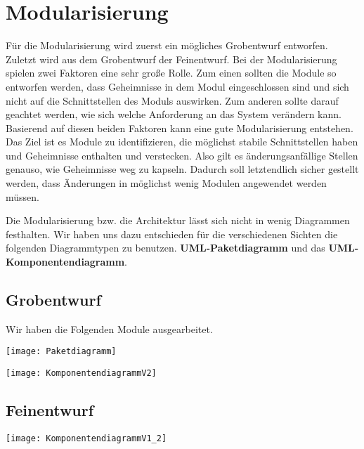 
\clearpage

\section{Modularisierung}
Für die Modularisierung wird zuerst ein mögliches Grobentwurf entworfen. Zuletzt wird aus dem Grobentwurf der Feinentwurf. Bei der Modularisierung spielen zwei Faktoren eine sehr große Rolle. Zum einen sollten die Module so entworfen werden, dass Geheimnisse in dem Modul eingeschlossen sind und sich nicht auf die Schnittstellen des Moduls auswirken. Zum anderen sollte darauf geachtet werden, wie sich welche Anforderung an das System verändern kann. Basierend auf diesen beiden Faktoren kann eine gute Modularisierung entstehen. Das Ziel ist es Module zu identifizieren, die möglichst stabile Schnittstellen haben und Geheimnisse enthalten und verstecken. Also gilt es änderungsanfällige Stellen genauso, wie Geheimnisse weg zu kapseln. Dadurch soll letztendlich sicher gestellt werden, dass Änderungen in möglichst wenig Modulen angewendet werden müssen. 

\vspace{6pt}

Die Modularisierung bzw. die Architektur lässt sich nicht in wenig Diagrammen festhalten. Wir haben uns dazu entschieden für die verschiedenen Sichten die folgenden Diagrammtypen zu benutzen. \textbf{UML-Paketdiagramm} und das \textbf{UML-Komponentendiagramm}.

\newpage

\subsection{Grobentwurf}
Wir haben die Folgenden Module ausgearbeitet.

\vspace{12pt}

\texttt{[image: Paketdiagramm]}

\newpage

\texttt{[image: KomponentendiagrammV2]}

\newpage

\subsection{Feinentwurf}

\texttt{[image: KomponentendiagrammV1\_2]}